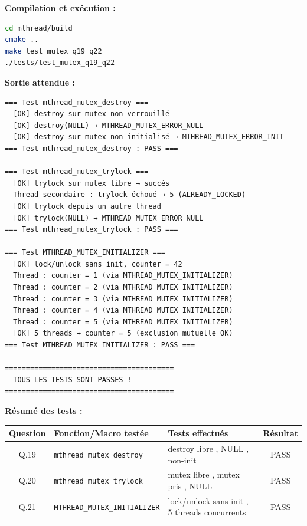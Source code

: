 \documentclass[11pt,a4paper]{article}
\newcommand{\cmark}{\ding{51}}
\let\oldtexttt\texttt
\renewcommand{\texttt}[1]{\oldtexttt{\color{keyword}#1}}
\begin{document}
\textbf{Compilation et exécution :}
\begin{lstlisting}[language=bash]
cd mthread/build
cmake ..
make test_mutex_q19_q22
./tests/test_mutex_q19_q22
\end{lstlisting}

\textbf{Sortie attendue :}
\begin{lstlisting}[language=text]
=== Test mthread_mutex_destroy ===
  [OK] destroy sur mutex non verrouillé
  [OK] destroy(NULL) → MTHREAD_MUTEX_ERROR_NULL
  [OK] destroy sur mutex non initialisé → MTHREAD_MUTEX_ERROR_INIT
=== Test mthread_mutex_destroy : PASS ===

=== Test mthread_mutex_trylock ===
  [OK] trylock sur mutex libre → succès
  Thread secondaire : trylock échoué → 5 (ALREADY_LOCKED)
  [OK] trylock depuis un autre thread
  [OK] trylock(NULL) → MTHREAD_MUTEX_ERROR_NULL
=== Test mthread_mutex_trylock : PASS ===

=== Test MTHREAD_MUTEX_INITIALIZER ===
  [OK] lock/unlock sans init, counter = 42
  Thread : counter = 1 (via MTHREAD_MUTEX_INITIALIZER)
  Thread : counter = 2 (via MTHREAD_MUTEX_INITIALIZER)
  Thread : counter = 3 (via MTHREAD_MUTEX_INITIALIZER)
  Thread : counter = 4 (via MTHREAD_MUTEX_INITIALIZER)
  Thread : counter = 5 (via MTHREAD_MUTEX_INITIALIZER)
  [OK] 5 threads → counter = 5 (exclusion mutuelle OK)
=== Test MTHREAD_MUTEX_INITIALIZER : PASS ===

========================================
  TOUS LES TESTS SONT PASSES !
========================================
\end{lstlisting}

\textbf{Résumé des tests :}
\begin{center}
\begin{tabular}{|c|l|l|c|}
\hline
\textbf{Question} & \textbf{Fonction/Macro testée} & \textbf{Tests effectués} & \textbf{Résultat} \\
\hline
Q.19 & \texttt{mthread\_mutex\_destroy} & destroy libre \cmark, NULL \cmark, non-init \cmark & PASS \\
\hline
Q.20 & \texttt{mthread\_mutex\_trylock} & mutex libre \cmark, mutex pris \cmark, NULL \cmark & PASS \\
\hline
Q.21 & \texttt{MTHREAD\_MUTEX\_INITIALIZER} & lock/unlock sans init \cmark, 5 threads concurrents \cmark & PASS \\
\hline
\end{tabular}
\end{center}
\end{document}

